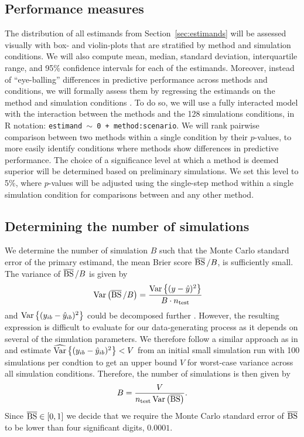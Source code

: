 \subsection{Performance measures} \label{sec:performance}

The distribution of all estimands from Section~\ref{sec:estimands} will be
assessed visually with box- and violin-plots that are stratified by method and
simulation conditions. We will also compute mean, median, standard deviation,
interquartile range, and 95\% confidence intervals
for each of the estimands. Moreover, instead of ``eye-balling'' differences in predictive
performance across methods and conditions, we will formally assess them by regressing
the estimands on the method and simulation conditions \citep[\cf][]{Skrondal2000}.
To do so, we will use
a fully interacted model with the interaction between the methods and the
128 simulations conditions, \ie in R notation:
\texttt{estimand $\sim$ 0 + method:scenario}. %
We will rank pairwise comparison between two methods within a single condition
by their $p$-values, to more easily identify conditions where methods
show differences in predictive performance. The choice of a significance level
at which a method is deemed superior will be determined based on preliminary
simulations. We set this level to 5\%, where $p$-values will be adjusted using
the single-step method \citep{pkg:multcomp} within a single simulation condition
for comparisons between \ainet{} and any other method.


\subsection{Determining the number of simulations}

We determine the number of simulation $B$ such that the Monte Carlo
standard error of the primary estimand, the mean Brier score $\operatorname{\overline{BS}}/B$,
is sufficiently small. The variance of $\operatorname{\overline{BS}}/B$ is given by
\begin{align*}
  \operatorname{Var}\left(\operatorname{\overline{BS}}/B\right)
  &= \frac{\operatorname{Var}\left\{(y -
    \hat{y})^{2}\right\}}{B \cdot n_{\text{test}}}
\end{align*}
and $\operatorname{Var}\left\{(y_{ib} - \hat{y}_{ib})^{2}\right\}$ could be decomposed further
\citep{Bradley2008}. However, the resulting expression is difficult to evaluate
for our data-generating process as it depends on several of the simulation
parameters. We therefore follow a similar approach as in \citet{Morris2019} and
estimate $\widehat{\operatorname{Var}}\left\{(y_{ib} - \hat{y}_{ib})^{2}\right\} < V$ from an
initial small simulation run with 100 simulations per condtion to get an upper
bound $V$ for worst-case variance across all simulation conditions.
Therefore, the number of simulations is then given by
$$B = \frac{V}{n_{\text{test}} \operatorname{Var}\left(\operatorname{\overline{BS}}\right)}.$$
Since $\operatorname{\overline{BS}} \in [0, 1]$ we decide that we require the Monte Carlo standard error
of $\operatorname{\overline{BS}}$ to be lower than four significant digits, $0.0001$.

